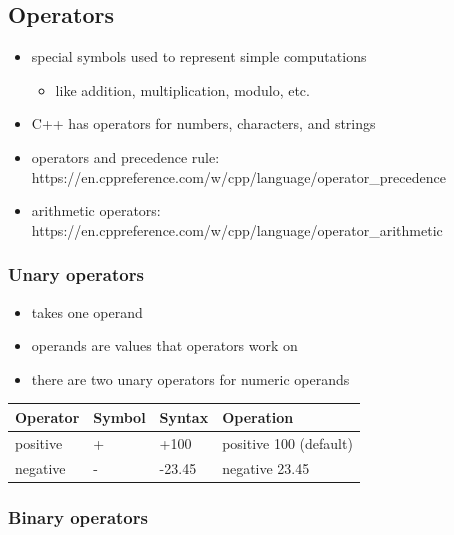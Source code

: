 \documentclass[11pt]{article}
\providecommand{\tightlist}{%
      \setlength{\itemsep}{0pt}\setlength{\parskip}{0pt}}
\begin{document}
    \hypertarget{operators}{%
\subsection{Operators}\label{operators}}

\begin{itemize}
\tightlist
\item
  special symbols used to represent simple computations

  \begin{itemize}
  \tightlist
  \item
    like addition, multiplication, modulo, etc.
  \end{itemize}
\item
  C++ has operators for numbers, characters, and strings
\item
  operators and precedence rule:
  https://en.cppreference.com/w/cpp/language/operator\_precedence
\item
  arithmetic operators:
  https://en.cppreference.com/w/cpp/language/operator\_arithmetic
\end{itemize}

\hypertarget{unary-operators}{%
\subsubsection{Unary operators}\label{unary-operators}}

\begin{itemize}
\tightlist
\item
  takes one operand
\item
  operands are values that operators work on
\item
  there are two unary operators for numeric operands
\end{itemize}

\begin{longtable}[]{@{}llll@{}}
\toprule
Operator & Symbol & Syntax & Operation \\
\midrule
\endhead
positive & + & +100 & positive 100 (default) \\
negative & - & -23.45 & negative 23.45 \\
\bottomrule
\end{longtable}

\hypertarget{binary-operators}{%
\subsubsection{Binary operators}\label{binary-operators}}
\end{document}
